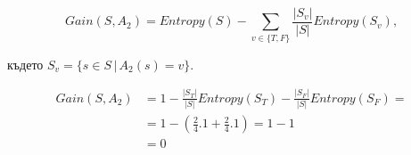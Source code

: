 \documentclass{article}
\begin{document}
\[
    Gain(S, A_2) = Entropy(S) - \sum_{v \in \{T, F\}} \frac{|S_v|}{|S|} Entropy(S_v),
\]

където \( S_v = \{ s \in S \, | \, A_2(s) = v \} \).

\begin{align*}
    Gain(S, A_2) &= 1 - \frac{|S_T|}{|S|} Entropy(S_T) - \frac{|S_F|}{|S|} Entropy(S_F) = \\
      &= 1 - \left(\frac{2}{4} . 1 + \frac{2}{4} . 1\right) = 1 - 1 \\
      &= 0
\end{align*}

\end{document}
